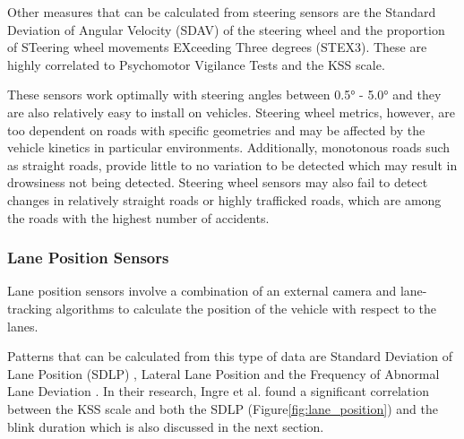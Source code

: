\documentclass[a4paper, 12pt]{extarticle}
\begin{document}
Other measures that can be calculated from steering sensors are the
Standard Deviation of Angular Velocity (SDAV) of the steering wheel and
the proportion of STeering wheel movements EXceeding Three degrees
(STEX3). These are highly correlated to Psychomotor Vigilance Tests and
the KSS scale. \cite{forsman_efficient_2013}

These sensors work optimally with steering angles between 0.5° - 5.0°
and they are also relatively easy to install on vehicles. Steering wheel
metrics, however, are too dependent on roads with specific geometries
and may be affected by the vehicle kinetics in particular environments.
Additionally, monotonous roads such as straight roads, provide little to
no variation to be detected which may result in drowsiness not being
detected. Steering wheel sensors may also fail to detect changes in
relatively straight roads or highly trafficked roads, which are among
the roads with the highest number of accidents.
\cite{eskandarian_evaluation_2007}

\hypertarget{lane-position-sensors}{%
\subsubsection{Lane Position Sensors}\label{lane-position-sensors}}

Lane position sensors involve a combination of an external camera and
lane-tracking algorithms to calculate the position of the vehicle with
respect to the lanes.

Patterns that can be calculated from this type of data are Standard
Deviation of Lane Position (SDLP) \cite{ingre_subjective_2006}, Lateral
Lane Position \cite{cheng_driver_2012} and the Frequency of Abnormal
Lane Deviation \cite{hu_experimental_2017}. In their research, Ingre et
al. \cite{ingre_subjective_2006} found a significant correlation between
the KSS scale and both the SDLP (Figure\ref{fig:lane_position}) and the blink duration
which is also discussed in the next section.
\end{document}

